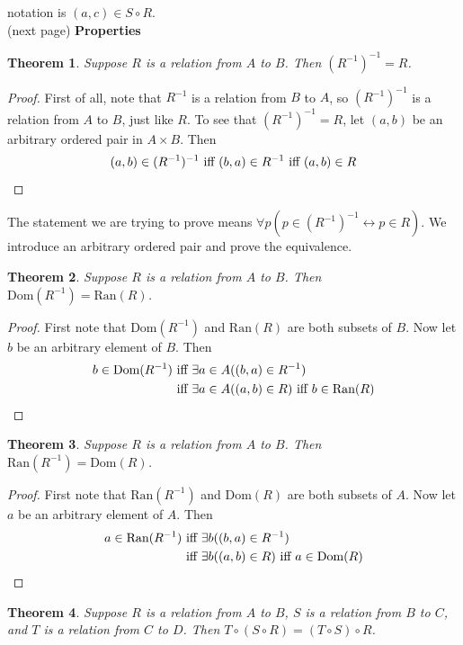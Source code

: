 \documentclass{report}
\newtheorem*{theorem}{Theorem}
\theoremstyle{definition}
\begin{document}
notation is $(a,c)\in S\circ R$.\\
(next page)\newpage
\noindent\textbf{Properties}
\begin{theorem}
Suppose $R$ is a relation from $A$ to $B$. Then $(R^{-1})^{-1}=R$.
\end{theorem}
\begin{proof}
First of all, note that $R^{-1}$ is a relation from $B$ to $A$, so $(R^{-1})^{-1}$ is a relation from $A$ to $B$, just like $R$. To see that $(R^{-1})^{-1}=R$, let
$(a,b)$ be an arbitrary ordered pair in $A\times B$. Then
\begin{equation*}
(a,b)\in(R^{-1})^{-1}\text{ iff }(b,a)\in R^{-1}\text{ iff }(a,b)\in R\qedhere
\end{equation*}
\end{proof}
\noindent The statement we are trying to prove means $\forall p(p\in(R^{-1})^{-1}\leftrightarrow p\in R)$. We introduce an arbitrary ordered pair and prove the equivalence.
\begin{theorem}
Suppose $R$ is a relation from $A$ to $B$. Then $\text{Dom}(R^{-1})=\text{Ran}(R)$.
\end{theorem}
\begin{proof}
First note that $\text{Dom}(R^{-1})$ and $\text{Ran}(R)$ are both subsets of $B$. Now let $b$ be an arbitrary element of $B$. Then 
\begin{align*}
b\in\text{Dom}(R^{-1})&\text{ iff }\exists a\in A((b,a)\in R^{-1})\\
&\text{ iff }\exists a\in A((a,b)\in R)\text{ iff }b\in\text{Ran}(R)\qedhere
\end{align*}
\end{proof}
\begin{theorem}
Suppose $R$ is a relation from $A$ to $B$. Then $\text{Ran}(R^{-1})=\text{Dom}(R)$.
\end{theorem}
\begin{proof}
First note that $\text{Ran}(R^{-1})$ and $\text{Dom}(R)$ are both subsets of $A$. Now let $a$ be an arbitrary element of $A$. Then
\begin{align*}
a\in\text{Ran}(R^{-1})&\text{ iff }\exists b((b,a)\in R^{-1})\\
&\text{ iff }\exists b((a,b)\in R)\text{ iff }a\in\text{Dom}(R)\qedhere
\end{align*}
\end{proof}
\begin{theorem}
Suppose $R$ is a relation from $A$ to $B$, $S$ is a relation from $B$ to $C$, and $T$ is a relation from $C$ to $D$. Then $T\circ(S\circ R)=(T\circ S)\circ R$.
\end{theorem}
\end{document}
